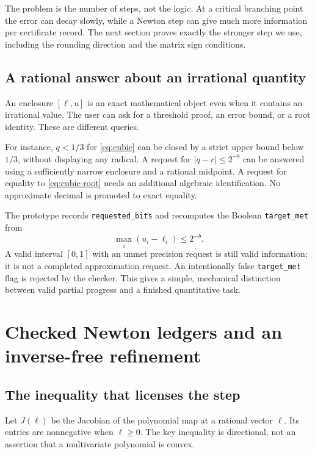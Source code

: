 \documentclass[11pt,a4paper]{article}
\theoremstyle{definition}\newtheorem{definition}[theorem]{Definition}
\theoremstyle{remark}\newtheorem{remark}[theorem]{Remark}
\newcommand{\code}[1]{\nolinkurl{#1}}
\begin{document}
The problem is the number of steps, not the logic. At a critical branching point the error can decay slowly, while a Newton step can give much more information per certificate record. The next section proves exactly the stronger step we use, including the rounding direction and the matrix sign conditions.

\subsection{A rational answer about an irrational quantity}
An enclosure $[\ell,u]$ is an exact mathematical object even when it contains an irrational value. The user can ask for a threshold proof, an error bound, or a root identity. These are different queries.

For instance, $q<1/3$ for \eqref{eq:cubic} can be closed by a strict upper bound below $1/3$, without displaying any radical. A request for $|q-r|\le2^{-b}$ can be answered using a sufficiently narrow enclosure and a rational midpoint. A request for equality to \eqref{eq:cubic-root} needs an additional algebraic identification. No approximate decimal is promoted to exact equality.

The prototype records \code{requested_bits} and recomputes the Boolean \code{target_met} from
\[
 \max_i(u_i-\ell_i)\le2^{-b}.
\]
A valid interval $[0,1]$ with an unmet precision request is still valid information; it is not a completed approximation request. An intentionally false \code{target_met} flag is rejected by the checker. This gives a simple, mechanical distinction between valid partial progress and a finished quantitative task.



\section{Checked Newton ledgers and an inverse-free refinement}
\label{sec:newton}
\subsection{The inequality that licenses the step}
Let $J(\ell)$ be the Jacobian of the polynomial map at a rational vector $\ell$. Its entries are nonnegative when $\ell\ge0$. The key inequality is directional, not an assertion that a multivariate polynomial is convex.
\end{document}
